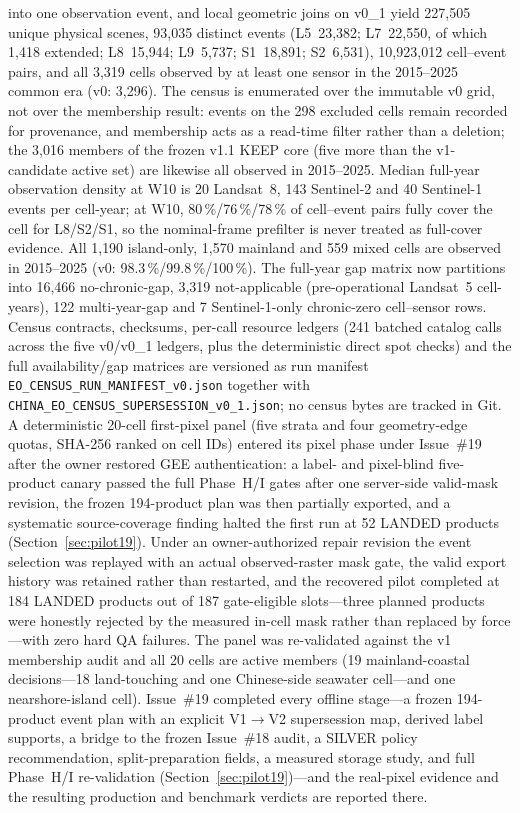 into one observation event, and local geometric joins on v0\_1 yield
227{,}505 unique physical scenes, 93{,}035 distinct events
(L5~23{,}382; L7~22{,}550, of which 1{,}418 extended; L8~15{,}944;
L9~5{,}737; S1~18{,}891; S2~6{,}531), 10{,}923{,}012 cell--event pairs,
and all 3{,}319 cells observed by at least one sensor in the
2015--2025 common era (v0: 3{,}296). The census is enumerated over the
immutable v0 grid, not over the membership result: events on the 298
excluded cells remain recorded for provenance, and membership acts as a
read-time filter rather than a deletion; the 3{,}016 members of the
frozen v1.1 KEEP core (five more than the v1-candidate active set) are
likewise all observed in 2015--2025. Median full-year observation
density at W10 is 20 Landsat~8, 143 Sentinel-2 and 40 Sentinel-1 events
per cell-year; at W10, 80\,\%/76\,\%/78\,\% of cell--event pairs fully
cover the cell for L8/S2/S1, so the nominal-frame prefilter is never
treated as full-cover evidence. All 1{,}190 island-only, 1{,}570
mainland and 559 mixed cells are observed in 2015--2025 (v0:
98.3\,\%/99.8\,\%/100\,\%). The full-year gap matrix now partitions
into 16{,}466 no-chronic-gap, 3{,}319 not-applicable (pre-operational
Landsat~5 cell-years), 122 multi-year-gap and 7 Sentinel-1-only
chronic-zero cell--sensor rows. Census contracts, checksums, per-call
resource ledgers (241 batched catalog calls across the five v0/v0\_1
ledgers, plus the deterministic direct spot checks) and the full
availability/gap matrices are versioned as run manifest
\texttt{EO\_CENSUS\_RUN\_MANIFEST\_v0.json} together with
\texttt{CHINA\_EO\_CENSUS\_SUPERSESSION\_v0\_1.json}; no census bytes
are tracked in Git. A deterministic 20-cell first-pixel panel (five strata
and four geometry-edge quotas, SHA-256 ranked on cell IDs) entered its
pixel phase under Issue~\#19 after the owner restored GEE
authentication: a label- and pixel-blind five-product canary passed the
full Phase~H/I gates after one server-side valid-mask revision, the
frozen 194-product plan was then partially exported, and a systematic
source-coverage finding halted the first run at 52 LANDED products
(Section~\ref{sec:pilot19}). Under an owner-authorized repair revision
the event selection was replayed with an actual observed-raster mask
gate, the valid export history was retained rather than restarted, and
the recovered pilot completed at 184 LANDED products out of 187
gate-eligible slots---three planned products were honestly rejected by
the measured in-cell mask rather than replaced by force---with zero
hard QA failures. The panel was re-validated against the v1
membership audit
and all 20 cells are active members (19 mainland-coastal
decisions---18 land-touching and one Chinese-side seawater cell---and
one nearshore-island cell). Issue~\#19 completed every offline
stage---a frozen 194-product event plan with an explicit V1$\rightarrow$V2
supersession map, derived label supports, a bridge to the frozen
Issue~\#18 audit, a SILVER policy recommendation, split-preparation
fields, a measured storage study, and full Phase~H/I re-validation
(Section~\ref{sec:pilot19})---and the real-pixel evidence and the
resulting production and benchmark verdicts are reported there.


